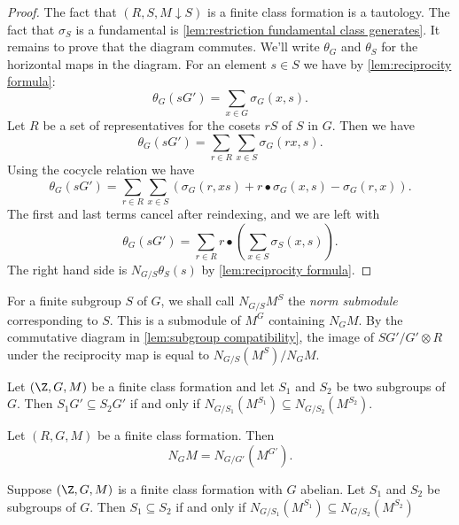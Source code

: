 \begin{proof}
	The fact that $(R, S, M \downarrow S)$ is a finite class formation is a tautology.
	The fact that $\sigma_S$
	is a fundamental is \ref{lem:restriction fundamental class generates}.
	It remains to prove that the diagram commutes.
	We'll write $\theta_G$ and $\theta_S$ for the horizontal maps in the diagram.
	For an element $s \in S$ we have by \ref{lem:reciprocity formula}:
	\[
		\theta_G(sG') = \sum_{x \in G} \sigma_G(x,s).
	\]
	Let $R$ be a set of representatives for the cosets $rS$ of $S$ in $G$.
	Then we have
	\[
		\theta_G(sG') = \sum_{r \in R} \sum_{x \in S} \sigma_G(rx,s).
	\]
	Using the cocycle relation we have
	\[
		\theta_G(sG') = \sum_{r \in R} \sum_{x \in S}
		\left(\sigma_G(r,xs) + r \bullet \sigma_G(x,s) - \sigma_G(r,x)\right).
	\]
	The first and last terms cancel after reindexing, and we are left with
	\[
		\theta_G(sG') = \sum_{r \in R} r \bullet \left(\sum_{x \in S}  \sigma_S(x,s)\right).
	\]
	The right hand side is $N_{G/S} \theta_S(s)$ by \ref{lem:reciprocity formula}.
\end{proof}


\begin{definition} \label{def:norm submodule}
	For a finite subgroup $S$ of $G$, we shall call $N_{G/S}M^S$ the \emph{norm submodule}
	corresponding to $S$. This is a submodule of $M^G$ containing $N_G M$.
	By the commutative diagram in \ref{lem:subgroup compatibility},
	the image of $SG'/G' \otimes R$ under the reciprocity map is equal to
	$N_{G/S}(M^S) / N_G M$.
\end{definition}


\begin{corollary} \label{cor:norm submodule mono}
	Let $(\Z,G,M)$ be a finite class formation
	and let $S_1$ and $S_2$ be two subgroups of $G$.
	Then $S_1 G' \subseteq S_2 G'$ if and only if
	$N_{G/S_1}(M^{S_1}) \subseteq N_{G/S_2}(M^{S_2})$.
\end{corollary}

\begin{corollary}  \label{cor:norm limitiation}
	Let $(R,G,M)$ be a finite class formation. Then
	\[
		N_G M = N_{G/G'} (M^{G'}).
	\]
\end{corollary}

\begin{corollary} \label{cor:abelian norm submodule mono}
	Suppose $(\Z,G,M)$ is a finite class formation with $G$ abelian.
	Let $S_1$ and $S_2$ be subgroups of $G$.
	Then $S_1 \subseteq S_2$ if and only if $N_{G/S_1}(M^{S_1}) \subseteq N_{G/S_2}(M^{S_2})$
\end{corollary}






